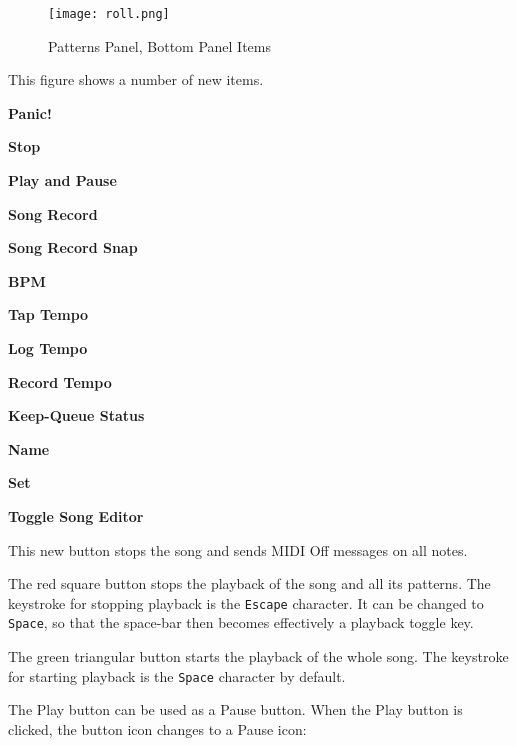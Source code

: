 \begin{figure}[H]
   \centering 
   \texttt{[image: roll.png]}
   \caption{Patterns Panel, Bottom Panel Items}
   \label{fig:pattern_window_bottom_panel_items}
\end{figure}

   This figure shows a number of new items.

   \begin{enumber}
      \item \textbf{Panic!}
      \item \textbf{Stop}
      \item \textbf{Play and Pause}
      \item \textbf{Song Record}
      \item \textbf{Song Record Snap}
      \item \textbf{BPM}
      \item \textbf{Tap Tempo}
      \item \textbf{Log Tempo}
      \item \textbf{Record Tempo}
      \item \textbf{Keep-Queue Status}
      \item \textbf{Name}
      \item \textbf{Set}
      \item \textbf{Toggle Song Editor}
   \end{enumber}

   \setcounter{ItemCounter}{0}      %

   This new button stops the song and sends MIDI Off messages on all notes.

   The red square button stops the playback of the song and all its patterns.
   The keystroke for stopping playback is the \texttt{Escape} character.
   It can be changed to \texttt{Space}, so that the space-bar then becomes
   effectively a playback toggle key.

   The green triangular button starts the playback of the whole song.
   The keystroke for starting playback is the \texttt{Space} character by
   default.

   The Play button can be used as a Pause button.
   When the Play button is clicked, the button icon changes to a Pause icon:

